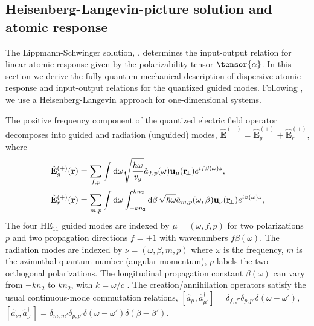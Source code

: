 \documentclass[preprint,aps,pra,onecolumn]{revtex4-1} %
\newcommand{\awg}{\hat{a}_{f,p}(\omega)}
\newcommand{\awr}{\hat{a}_{m,p}(\omega,\beta)}
\begin{document}
	
	\subsection{Heisenberg-Langevin-picture solution and atomic response}
	
The Lippmann-Schwinger solution, , determines the input-output relation for linear atomic response given by the polarizability tensor $\tensor{\alpha}$.  In this section we derive the fully quantum mechanical description of dispersive atomic response and input-output relations for the quantized guided modes.  Following \cite{le_kien_spontaneous_2005}, we use a Heisenberg-Langevin approach for one-dimensional systems.  

The positive frequency component of the quantized electric field operator decomposes into guided and radiation (unguided) modes, $\hat{\mathbf{E}}^{(+)}=\hat{\mathbf{E}}_g^{(+)}+\hat{\mathbf{E}}_{r}^{(+)}$, where
	\begin{align}
		\hat{\mathbf{E}}_g^{(+)}(\br) &= \sum_{f,p} \int \mathrm{d}\omega  \sqrt{\frac{ \hbar \omega}{ v_g}} \awg \mathbf{u}_\mu (\br\!_\perp) e^{i f\beta(\omega) z } ,\label{Eq::QuantizedElectricField} \\
		\hat{\mathbf{E}}_r^{(+)}(\br) &= \sum_{m,p} \int \mathrm{d}\omega   \int_{-kn_2}^{kn_2}\mathrm{d}\beta \, \sqrt{ \hbar \omega}\awr \mathbf{u}_\nu (\br\!_\perp) e^{i\beta(\omega) z },
	\end{align}
The four HE$_{11}$ guided modes are indexed by $\mu =(\omega, f, p)$ for two polarizations $p$ and two propagation directions $f=\pm1$ with wavenumbers $f\beta (\omega)$.  The radiation modes are indexed by  $\nu=(\omega, \beta, m, p)$ where $\omega$ is the frequency, $m$ is the azimuthal quantum number (angular momentum), $p$ labels the two orthogonal polarizations. The longitudinal propagation constant $\beta(\omega)$ can vary from $-kn_2$ to $kn_2$, with $k = \omega/c$ \cite{sondergaard_general_2001,le_kien_spontaneous_2005}.  The creation/annihilation operators satisfy the usual continuous-mode commutation relations, $[\hat{a}_\mu, \hat{a}^\dag_{\mu'} ] = \delta_{f,f'} \delta_{p,p'} \delta ( \omega - \omega ') $, $[\hat{a}_\nu ,\hat{a}^\dag_{\nu'} ] = \delta_{m,m'} \delta_{p,p'} \delta ( \omega - \omega ')  \delta ( \beta - \beta') $.
\end{document}
